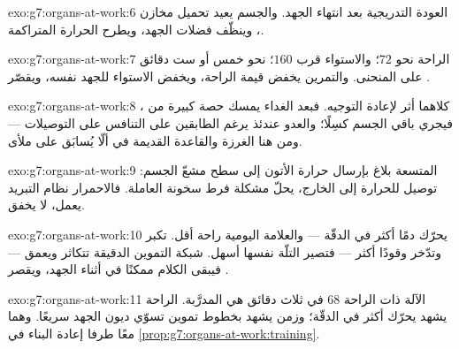 \begin{solution}{exo:g7:organs-at-work:6}
العودة التدريجية   بعد انتهاء الجهد. والجسم يعيد
تحميل مخازن ، وينظّف فضلات الجهد، ويطرح الحرارة
المتراكمة.
\end{solution}

\begin{solution}{exo:g7:organs-at-work:7}
الراحة نحو $72$؛ والاستواء قرب $160$؛  نحو خمس أو ست دقائق
على المنحنى. والتمرين يخفض قيمة الراحة، ويخفض الاستواء للجهد نفسه،
ويقصّر .
\end{solution}

\begin{solution}{exo:g7:organs-at-work:8}
كلاهما أثر لإعادة التوجيه. فبعد الغداء يمسك  حصة
كبيرة من ، فيجري باقي الجسم كسِلًا؛ والعدو عندئذ يرغم الطابقين
على التنافس على التوصيلات --- ومن هنا الغرزة والقاعدة القديمة في
ألّا يُسابَق على  ملأى.
\end{solution}

\begin{solution}{exo:g7:organs-at-work:9}
  المتسعة بلاغ بإرسال حرارة الأتون إلى سطح مشعّ الجسم:
توصيل للحرارة إلى الخارج، يحلّ مشكلة فرط سخونة  العاملة.
فالاحمرار نظام التبريد يعمل، لا يخفق.
\end{solution}

\begin{solution}{exo:g7:organs-at-work:10}
 يحرّك دمًا أكثر في الدقّة --- والعلامة اليومية  راحة أقل.
 تكبر وتدّخر وقودًا أكثر --- فتصير التلّة نفسها أسهل.
 شبكة التموين الدقيقة تتكاثر ويعمق  --- فيبقى الكلام
ممكنًا في أثناء الجهد، ويقصر .
\end{solution}

\begin{solution}{exo:g7:organs-at-work:11}
الآلة ذات الراحة $68$  في ثلاث دقائق هي المدرَّبة. 
الراحة يشهد  يحرّك أكثر في الدقّة؛ وزمن  يشهد بخطوط
تموين تسوّي ديون الجهد سريعًا. وهما معًا طرفا إعادة البناء في
\cref{prop:g7:organs-at-work:training}.
\end{solution}

